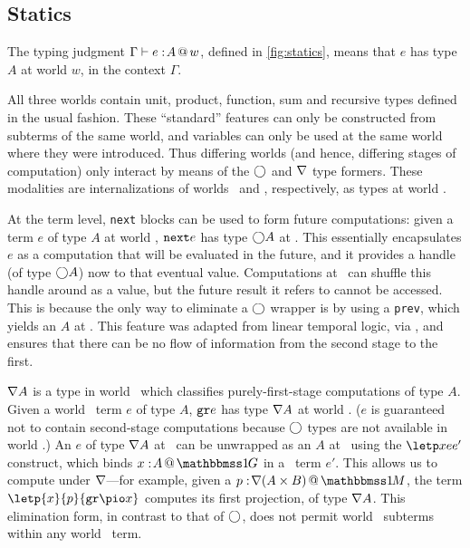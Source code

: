 \subsection{Statics}
\label{sec:statics}



\begin{abstrsyn}

The typing judgment $\Gamma{} \vdash {e}:\!{A}~\hspace{-0.2em}\textsc{\textrm{@}}\hspace{-0.2em}~w$, defined in \ref{fig:statics}, means that
$e$ has type $A$ at world $w$, in the context $\Gamma$. 

All three worlds contain unit, product, function, sum and recursive types defined in the usual fashion.
These ``standard'' features can only be constructed from subterms of the same world,
and variables can only be used at the same world where they were introduced.
Thus differing worlds (and hence, differing stages of computation) only interact by means
of the $\bigcirc$ and $\nabla$ type formers.  These modalities are internalizations
of worlds \bbtwo\ and \bbonep, respectively, as types at world \bbonem.

At the term level, {\tt next} blocks can be used to form future computations:
given a term $e$ of type $A$ at world \bbtwo, ${\tt next}{e}$ has type $\bigcirc A$ at \bbonem. 
This essentially encapsulates $e$ as a computation that will be evaluated in the future, 
and it provides a handle (of type $\bigcirc A$) now to that eventual value.
Computations at \bbonem\ can shuffle this handle around as a value, but the future result it refers to cannot be accessed.
This is because the only way to eliminate a $\bigcirc$ wrapper is by using a {\tt prev}, which yields an $A$ at \bbtwo.
This feature was adapted from linear temporal logic, via \cite{davies96},
and ensures that there can be no flow of information from the second stage to the first.

$\nabla A$ is a type in world \bbonem\ which classifies purely-first-stage
computations of type $A$. Given a world \bbonep\ term $e$ of type $A$,
${\tt gr}{e}$ has type $\nabla A$ at world \bbonem. ($e$ is guaranteed not to contain
second-stage computations because $\bigcirc$ types are not available in world
\bbonep.)
An $e$ of type $\nabla A$ at \bbonem\ can be unwrapped as an $A$ at \bbonep\
using the $\letp xe{e'}$ construct, which binds $\colpure xA$ in a \bbonem\ term
$e'$. This allows us to compute under $\nabla$---for example, given a $\colmix
p{\curr(A\times B)}$, the term $\letp{x}{p}{\pure{\pio x}}$ computes its first
projection, of type $\nabla A$.
This elimination form, in contrast to that of $\bigcirc$, does not permit world \bbonem\ subterms
within any world \bbonep\ term.


\end{abstrsyn}
